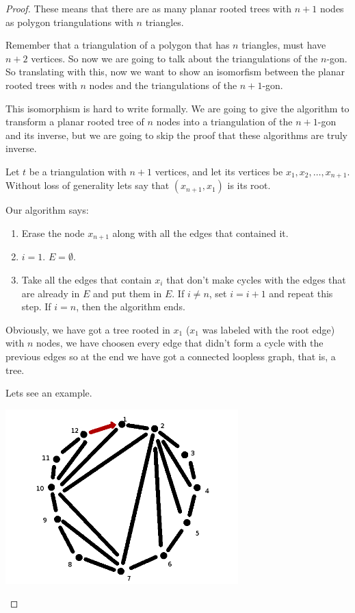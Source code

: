 \begin{proof}
    These means that there are as many planar rooted trees with $n + 1$ nodes as polygon triangulations with $n$ triangles.\pn
    
    Remember that a triangulation of a polygon that has $n$ triangles, must have $n + 2$ vertices. So now we are going to talk about
    the triangulations of the $n$-gon. So translating with this, now we want to show an isomorfism between the planar rooted trees with $n$ nodes
    and the triangulations of the $n + 1$-gon.\pn
    
    This isomorphism is hard to write formally. We are going to give the algorithm to transform a planar rooted tree of $n$ nodes into a triangulation
    of the $n + 1$-gon and its inverse, but we are going to skip the proof that these algorithms are truly inverse.\pn
    
    Let $t$ be a triangulation with $n+1$ vertices, and let its vertices be $x_1, x_2, \dots, x_{n+1}$. Without loss of generality lets say that
    $(x_{n+1}, x_1)$ is its root.\pn
    
    Our algorithm says:
    
    \begin{enumerate}
        \item 
            Erase the node $x_{n+1}$ along with all the edges that contained it.
        \item
            $i = 1.$\pn
            $E = \emptyset.$
        
        \item
            Take all the edges that contain $x_i$ that don't make cycles with the edges that are already in $E$ and
            put them in $E$. If $i \neq n$, set $i = i + 1$ and repeat this step. If $i = n$, then the algorithm ends.
    \end{enumerate}
    
    Obviously, we have got a tree rooted in $x_1$ ($x_1$ was labeled with the root edge) with $n$ nodes, we have choosen every edge that 
    didn't form a cycle with the previous edges so at the end we have got a connected loopless graph, that is, a tree.\pn
    
    Lets see an example.\pn
    \begin{center}
        \includegraphics[width=9cm]{Homework1/Problem4/TriangulationToPlanarRootedTree1.png}
    \end{center}
    

\end{proof}
